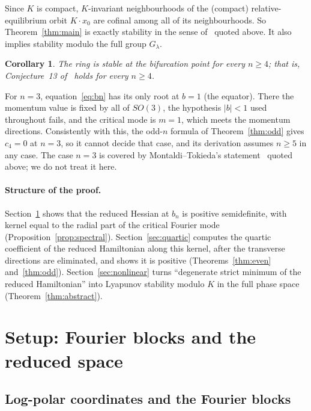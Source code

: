 \documentclass[11pt]{article}
\newtheorem{corollary}[theorem]{Corollary}
\theoremstyle{definition}
\theoremstyle{remark}
\begin{document}
Since $K$ is compact, $K$-invariant neighbourhoods of the (compact) relative-equilibrium orbit $K\cdot x_0$
are cofinal among all of its neighbourhoods. So Theorem~\ref{thm:main} is exactly stability in the sense
of~\cite[p.~10]{MT} quoted above. It also implies stability modulo the full group $G_\lambda$.

\begin{corollary}
The ring is stable at the bifurcation point for every $n\ge4$; that is, Conjecture~13 of~\cite{MT} holds
for every $n\ge4$.
\end{corollary}

For $n=3$, equation~\eqref{eq:bn} has its only root at $b=1$ (the equator). There the momentum value is
fixed by all of $SO(3)$, the hypothesis $|b|<1$ used throughout fails, and the critical mode is $m=1$,
which meets the momentum directions. Consistently with this, the odd-$n$ formula of
Theorem~\ref{thm:odd} gives $c_4=0$ at $n=3$, so it cannot decide that case, and its derivation assumes
$n\ge5$ in any case. The case $n=3$ is covered by Montaldi--Tokieda's statement~\cite[p.~15]{MT}
quoted above; we do not treat it here.

\paragraph{Structure of the proof.} Section~\ref{sec:setup} shows that the reduced Hessian at $b_n$ is
positive semidefinite, with kernel equal to the radial part of the critical Fourier mode
(Proposition~\ref{prop:spectral}). Section~\ref{sec:quartic} computes the quartic coefficient of the
reduced Hamiltonian along this kernel, after the transverse directions are eliminated, and shows it is
positive (Theorems~\ref{thm:even} and~\ref{thm:odd}). Section~\ref{sec:nonlinear} turns ``degenerate strict
minimum of the reduced Hamiltonian'' into Lyapunov stability modulo $K$ in the full phase space
(Theorem~\ref{thm:abstract}).

\section{Setup: Fourier blocks and the reduced space}\label{sec:setup}

\subsection{Log-polar coordinates and the Fourier blocks}
\end{document}

